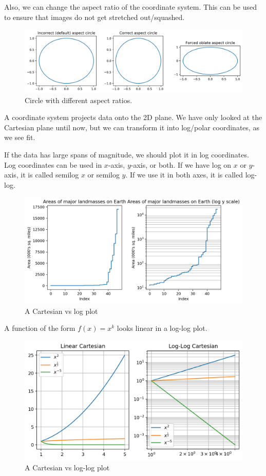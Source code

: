 \documentclass[a4paper, openany]{memoir}
\begin{document}
\noindent Also, we can change the aspect ratio of the coordinate system. This can be used to ensure that images do not get stretched out/squashed.
\begin{figure}[H]
    \centering
    \includegraphics[scale=0.4]{src/2.56 aspect circle.png}
    \caption{Circle with different aspect ratios.}    
\end{figure}

A coordinate system projects data onto the 2D plane. We have only looked at the Cartesian plane until now, but we can transform it into log/polar coordinates, as we see fit.

If the data has large spans of magnitude, we should plot it in log coordinates. Log coordinates can be used in $x$-axis, $y$-axis, or both. If we have log on $x$ or $y$-axis, it is called semilog $x$ or semilog $y$. If we use it in both axes, it is called log-log.
\begin{figure}[H]
    \centering
    \includegraphics[scale=0.5]{src/2.57 log scale.png}
    \caption{A Cartesian vs log plot}    
\end{figure}
\noindent A function of the form $f(x) = x^k$ looks linear in a log-log plot.
\begin{figure}[H]
    \centering
    \includegraphics[scale=0.5]{src/2.58 linear v log log.png}
    \caption{A Cartesian vs log-log plot}    
\end{figure}
\end{document}
